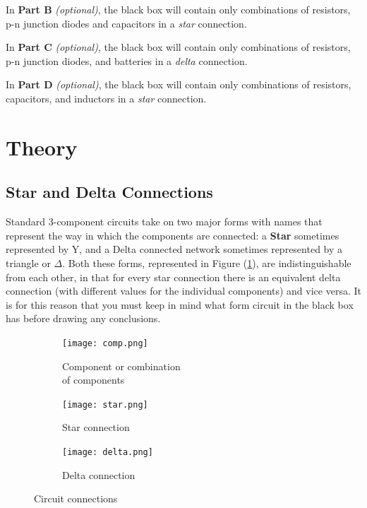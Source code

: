 In \textbf{Part B} \textit{(optional)}, the black box will contain only combinations of resistors, p-n junction diodes and capacitors in a \textit{star} connection. 

In \textbf{Part C} \textit{(optional)}, the black box will contain only combinations of resistors, p-n junction diodes, and batteries in a \textit{delta} connection. 

In \textbf{Part D} \textit{(optional)}, the black box will contain only combinations of  resistors, capacitors, and inductors in a \textit{star} connection.


\section*{Theory}

\subsection*{Star and Delta Connections}

Standard 3-component circuits take on two major forms with names that represent the way in which the components are connected: a \textbf{Star} sometimes represented by Y, and a Delta connected network sometimes represented by a triangle or $\Delta$. Both these forms, represented in Figure (\ref{fig:starAndDelta}), are indistinguishable from each other, in that for every star connection there is an equivalent delta connection (with different values for the individual components) and vice versa. It is for this reason that you must keep in mind what form circuit in the black box has before drawing any conclusions.

\begin{figure}[!htb]
       \begin{subfigure}[t]{0.3\textwidth}
				\centering
                \texttt{[image: comp.png]}
                \captionsetup{justification=centering}
                \caption{Component or combination \\of components}
       \end{subfigure}%
       \begin{subfigure}[t]{0.3\textwidth}
				\centering
                \texttt{[image: star.png]}
                \caption{Star connection}
        \end{subfigure}%
        \begin{subfigure}[t]{0.3\textwidth}
        		\centering
                \texttt{[image: delta.png]}
                \caption{Delta connection}
        \end{subfigure}%
        \caption{Circuit connections}
        \label{fig:starAndDelta}
\end{figure}

